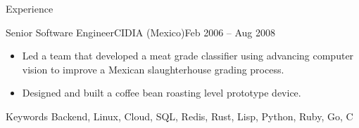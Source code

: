 \documentclass[colibri]{mcdowellcv}
\begin{document}
\begin{cvsection}{Experience}
\begin{cvsubsection}{Senior Software Engineer}{CIDIA (Mexico)}{Feb 2006 -- Aug 2008}
\begin{itemize}
      profilometry research.
    \item
      Led a team that developed a meat grade classifier using advancing computer
      vision to improve a Mexican slaughterhouse grading process.
    \item
      Designed and built a coffee bean roasting level prototype device.
		\end{itemize}
	\end{cvsubsection}
  \begin{cvsubsection}{Keywords}{}{}
    Backend, Linux, Cloud, SQL, Redis, Rust, Lisp, Python, Ruby, Go, C
  \end{cvsubsection}
\end{cvsection}
\end{document}
